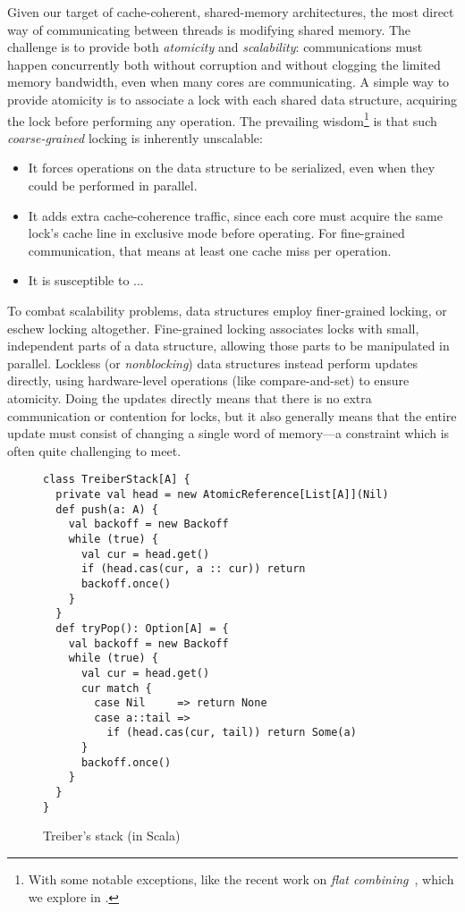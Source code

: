 \documentclass[preprint]{sigplanconf}
\begin{document}
Given our target of cache-coherent, shared-memory architectures, the
most direct way of communicating between threads is modifying shared
memory.  The challenge is to provide both \emph{atomicity} and
\emph{scalability}: communications must happen concurrently both
without corruption and without clogging the limited memory bandwidth,
even when many cores are communicating.  A simple way to provide
atomicity is to associate a lock with each shared data structure,
acquiring the lock before performing any operation.  The prevailing
wisdom\footnote{With some notable exceptions, like the recent work on
  \emph{flat combining}~\cite{?}, which we explore in .} is
that such \emph{coarse-grained} locking is inherently unscalable:
\begin{itemize}
\item It forces operations on the data structure to be serialized,
  even when they could be performed in parallel.
\item It adds extra cache-coherence traffic, since each core must
  acquire the same lock's cache line in exclusive mode before
  operating.  For fine-grained communication, that means at least one
  cache miss per operation.
\item It is susceptible to ... %
\end{itemize}

To combat scalability problems, data structures employ finer-grained locking,
or eschew locking altogether.  Fine-grained locking associates locks with
small, independent parts of a data structure, allowing those parts to be
manipulated in parallel.  Lockless (or \emph{nonblocking}) data structures
instead perform updates directly, using hardware-level operations (like
compare-and-set) to ensure atomicity.  Doing the updates directly means that
there is no extra communication or contention for locks, but it also generally
means that the entire update must consist of changing a single word of
memory---a constraint which is often quite challenging to meet.  

\begin{figure}
\begin{lstlisting}
class TreiberStack[A] {
  private val head = new AtomicReference[List[A]](Nil)
  def push(a: A) {
    val backoff = new Backoff
    while (true) {
      val cur = head.get()
      if (head.cas(cur, a :: cur)) return
      backoff.once()
    }
  }
  def tryPop(): Option[A] = {
    val backoff = new Backoff
    while (true) {
      val cur = head.get() 
      cur match {
        case Nil     => return None
        case a::tail => 
          if (head.cas(cur, tail)) return Some(a)
      }
      backoff.once()
    }
  }
}
\end{lstlisting}
\nocaptionrule
\caption{Treiber's stack (in Scala)}
\label{fig:classic-treiber}
\end{figure}
\end{document}
